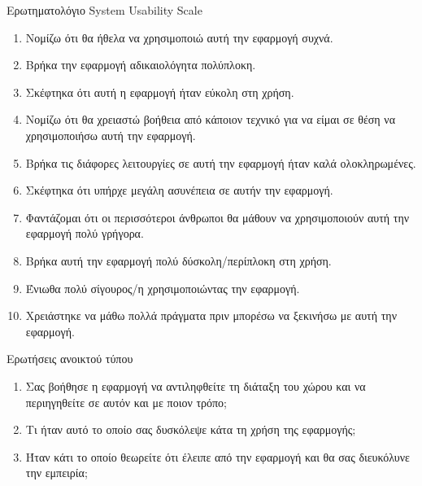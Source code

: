 
{\LARGE Ερωτηματολόγιο System Usability Scale}
\begin{enumerate}[topsep=0.05\linewidth]
    \item Νομίζω ότι θα ήθελα να χρησιμοποιώ αυτή την εφαρμογή συχνά.
    \item Βρήκα την εφαρμογή αδικαιολόγητα πολύπλοκη.
    \item Σκέφτηκα ότι αυτή η εφαρμογή ήταν εύκολη στη χρήση.
    \item Νομίζω ότι θα χρειαστώ βοήθεια από κάποιον τεχνικό για να είμαι σε θέση να χρησιμοποιήσω αυτή την εφαρμογή.
    \item Βρήκα τις διάφορες λειτουργίες σε αυτή την εφαρμογή ήταν καλά ολοκληρωμένες.
    \item Σκέφτηκα ότι υπήρχε μεγάλη ασυνέπεια σε αυτήν την εφαρμογή.
    \item Φαντάζομαι ότι οι περισσότεροι άνθρωποι θα μάθουν να χρησιμοποιούν αυτή την εφαρμογή πολύ γρήγορα.
    \item Βρήκα αυτή την εφαρμογή πολύ δύσκολη/περίπλοκη στη χρήση.
    \item Ένιωθα πολύ σίγουρος/η χρησιμοποιώντας την εφαρμογή.
    \item Χρειάστηκε να μάθω πολλά πράγματα πριν μπορέσω να ξεκινήσω με αυτή την εφαρμογή.
\end{enumerate}

{\LARGE Ερωτήσεις ανοικτού τύπου}
\begin{enumerate}[topsep=0.05\linewidth]
    \item Σας βοήθησε η εφαρμογή να αντιληφθείτε τη διάταξη του χώρου και να περιηγηθείτε σε αυτόν και με ποιον τρόπο;
    \item Τι ήταν αυτό το οποίο σας δυσκόλεψε κάτα τη χρήση της εφαρμογής;
    \item Ήταν κάτι το οποίο θεωρείτε ότι έλειπε από την εφαρμογή και θα σας διευκόλυνε την εμπειρία;
\end{enumerate}